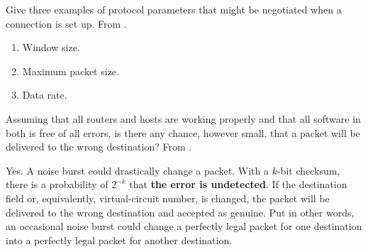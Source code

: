 \begin{Exercise}
Give three examples of protocol parameters that might be negotiated when a connection is set up.
From \cite{computer-networks-tanenbaum-2012}.
\end{Exercise}
\begin{Answer}
\begin{enumerate}
    \item Window size.
    \item Maximum packet size.
    \item Data rate.
\end{enumerate}
\end{Answer}

\begin{Exercise}
Assuming that all routers and hosts are working properly and that all software in both is free of all errors, is there any chance, however small, that a packet will be delivered to the wrong destination?
From \cite{computer-networks-tanenbaum-2012}.
\end{Exercise}
\begin{Answer}
Yes. A noise burst could drastically change a packet. With a \(k\)-bit checksum, there is a probability of \(2^{-k}\) that \textbf{the error is undetected}. If the destination field or, equivalently, virtual-circuit number, is changed, the packet will be delivered to the wrong destination and accepted as genuine. Put in other words, an occasional noise burst could change a perfectly legal packet for one destination into a perfectly legal packet for another destination.
\end{Answer}
